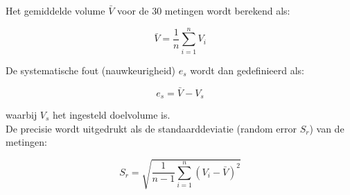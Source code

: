 Het gemiddelde volume $\bar{V}$ voor de 30 metingen wordt berekend als:

\begin{equation} \bar{V} = \frac{1}{n} \sum_{i=1}^{n} V_i \end{equation}

De systematische fout (nauwkeurigheid) $e_s$ wordt dan gedefinieerd als:

\begin{equation} e_s = \bar{V} - V_s \end{equation}

waarbij $V_s$ het ingesteld doelvolume is. 
\\[12pt]De precisie wordt uitgedrukt als de standaarddeviatie (random error $S_r$) van de metingen:

\begin{equation} S_r = \sqrt{ \frac{1}{n-1} \sum_{i=1}^{n} {(V_i - \bar{V})}^2 } \end{equation}